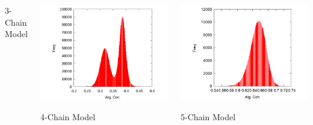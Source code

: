 \documentclass[aspectratio=169,11pt, dvipdfmx]{beamer}
\begin{document}
\begin{frame}
\begin{columns}[totalwidth=1\textwidth]
\begin{center}
					3-Chain Model
				\end{center}
				\begin{center}
					\includegraphics[width=8\columnwidth]{4_1000_5000.png}

					4-Chain Model
				\end{center}
				\begin{center}
					\includegraphics[width=.8\columnwidth]{5.png}

					5-Chain Model
				\end{center}
		\end{columns}
\end{frame}
\end{document}
